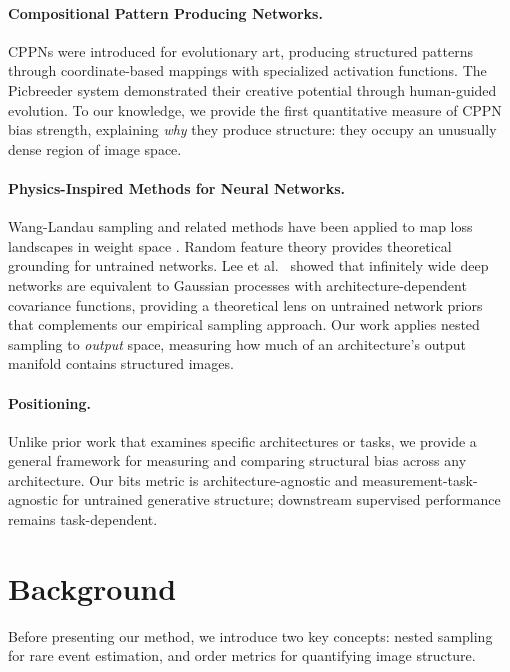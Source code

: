 \documentclass{article}
\begin{document}
\paragraph{Compositional Pattern Producing Networks.}
CPPNs \cite{stanley2007cppn} were introduced for evolutionary art, producing structured patterns through coordinate-based mappings with specialized activation functions. The Picbreeder system \cite{secretan2008picbreeder} demonstrated their creative potential through human-guided evolution. To our knowledge, we provide the first quantitative measure of CPPN bias strength, explaining \emph{why} they produce structure: they occupy an unusually dense region of image space.

\paragraph{Physics-Inspired Methods for Neural Networks.}
Wang-Landau sampling and related methods have been applied to map loss landscapes in weight space \cite{mele2025density}. Random feature theory \cite{yehudai2019power} provides theoretical grounding for untrained networks. Lee et al.\ \cite{lee2018deep} showed that infinitely wide deep networks are equivalent to Gaussian processes with architecture-dependent covariance functions, providing a theoretical lens on untrained network priors that complements our empirical sampling approach. Our work applies nested sampling \cite{skilling2006nested} to \emph{output} space, measuring how much of an architecture's output manifold contains structured images.

\paragraph{Positioning.} Unlike prior work that examines specific architectures or tasks, we provide a general framework for measuring and comparing structural bias across any architecture. Our bits metric is architecture-agnostic and measurement-task-agnostic for untrained generative structure; downstream supervised performance remains task-dependent.


\section{Background}
\label{sec:background}


Before presenting our method, we introduce two key concepts: nested sampling for rare event estimation, and order metrics for quantifying image structure.
\end{document}
